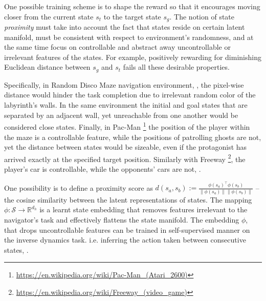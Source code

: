 \documentclass[acmsmall, nonacm]{acmart}
\begin{document}
One possible training scheme is to shape the reward so that it encourages moving closer from the current state $s_t$ to the target state $s_g$. The notion of state \emph{proximity} must take into account the fact that states reside on certain latent manifold, must be consistent with respect to environment's randomness, and at the same time focus on controllable and abstract away uncontrollable or irrelevant features of the states. For example, positively rewarding for diminishing Euclidean distance between $s_g$ and $s_t$ fails all these desirable properties.

Specifically, in Random Disco Maze navigation environment, \citep{badia_never_2020}, the pixel-wise distance would hinder the task completion due to irrelevant random color of the labyrinth's walls. In the same environment the initial and goal states that are separated by an adjacent wall, yet unreachable from one another would be considered close states. Finally, in Pac-Man%
\footnote{
    \url{https://en.wikipedia.org/wiki/Pac-Man_(Atari_2600)}
}
the position of the player within the maze is a controllable feature, while the positions of patrolling ghosts are not, yet the distance between states would be sizeable, even if the protagonist has arrived exactly at the specified target position.
%
Similarly with Freeway%
\footnote{
    \url{https://en.wikipedia.org/wiki/Freeway_(video_game)}
}, the player's car is controllable, while the opponents' cars are not, \citep[fig.~1]{choi_contingency-aware_2019}.


One possibility is to define a proximity score as $
    d(s_a, s_b) 
        := \frac{\phi(s_a)^\top \phi(s_b)}{\|\phi(s_a)\|\|\phi(s_b)\|}
$ -- the cosine similarity between the latent representations of states. The mapping $
    \phi \colon \mathcal{S} \to \mathbb{R}^{d_h}
$ is a learnt state embedding that removes features irrelevant to the navigator's task and effectively flattens the state manifold. The embedding $\phi$, that drops uncontrollable features can be trained in self-supervised manner on the inverse dynamics task. i.e. inferring the action taken between consecutive states, \citep{choi_contingency-aware_2019,badia_never_2020}.

\end{document}
